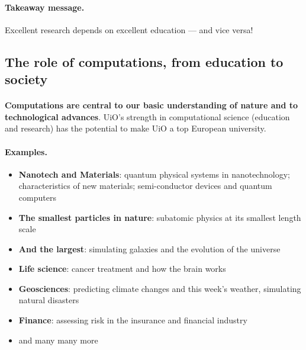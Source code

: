 \documentclass[%
twoside,                 %
final,                   %
10pt]{article}
\begin{document}
\noindent



\paragraph{Takeaway message.}
Excellent research depends on excellent education --- and vice versa!



\subsection{The role of computations, from education to society}

\paragraph{}
\textbf{Computations are central to our 
basic understanding of nature and to technological advances}.
UiO's strength in computational science (education and research)
has the potential to make UiO a top European university.




\paragraph{Examples.}
\begin{itemize}
\item \textbf{Nanotech and Materials}: quantum physical systems in nanotechnology; characteristics of new materials; semi-conductor devices and quantum computers

\item \textbf{The smallest particles in nature}: subatomic physics at its smallest length scale

\item \textbf{And the largest}: simulating galaxies and the evolution of the universe

\item \textbf{Life science}: cancer treatment and how the brain works

\item \textbf{Geosciences}: predicting climate changes and this week's weather, simulating natural disasters

\item \textbf{Finance}: assessing risk in the insurance and financial industry

\item and many many more
\end{itemize}
\end{document}
